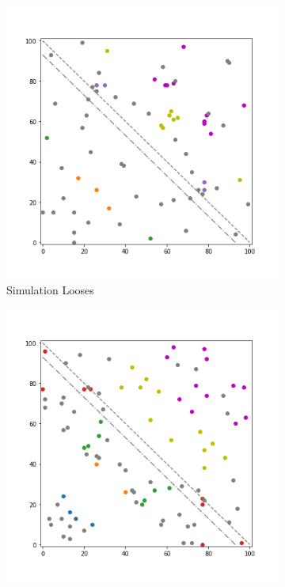 \begin{figure}[!ht]
	\centering
	\begin{subfigure}{.3\textwidth}%
    	\centering
    	\includegraphics[width=1\linewidth]{Bilder/simulation_2_5}
    	\caption{Simulation Looses}
	\end{subfigure}%
	\begin{subfigure}{.3\textwidth}%
    	\centering
    	\includegraphics[width=1\linewidth]{Bilder/simulation_3_5}

\end{subfigure}
\end{figure}
